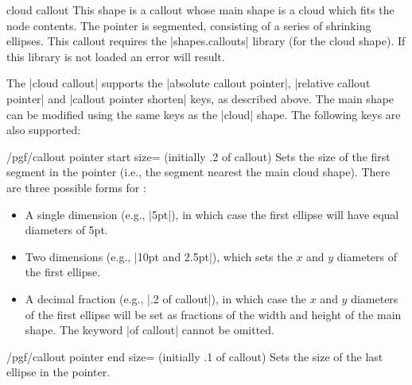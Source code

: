 \begin{shape}{cloud callout}
    This shape is a callout whose main shape is a cloud which fits the node
    contents. The pointer is segmented, consisting of a series of shrinking
    ellipses. This callout requires the |shapes.callouts| library (for the cloud
    shape). If this library is not loaded an error will result.
\begin{codeexample}[preamble={\usetikzlibrary{shapes.callouts}}]
\end{codeexample}

    The |cloud callout| supports the |absolute callout pointer|,
    |relative callout pointer| and |callout pointer shorten| keys, as described
    above. The main shape can be modified using the same keys as the |cloud|
    shape. The following keys are also supported:

    \begin{key}{/pgf/callout pointer start size= (initially .2 of callout)}
        Sets the size of the first segment in the pointer (i.e., the segment
        nearest the main cloud shape). There are three possible forms for
        :
        \begin{itemize}
            \item A single dimension (e.g., |5pt|), in which case the first
                ellipse will have equal diameters of 5pt.
            \item Two dimensions (e.g., |10pt and 2.5pt|), which sets the $x$
                and $y$ diameters of the first ellipse.
            \item A decimal fraction (e.g., |.2 of callout|), in which case the
                $x$ and $y$ diameters of the first ellipse will be set as
                fractions of the width and height of the main shape. The
                keyword |of callout| cannot be omitted.
        \end{itemize}
    \end{key}

    \begin{key}{/pgf/callout pointer end size= (initially .1 of callout)}
        Sets the size of the last ellipse in the pointer.
    \end{key}


\end{shape}
